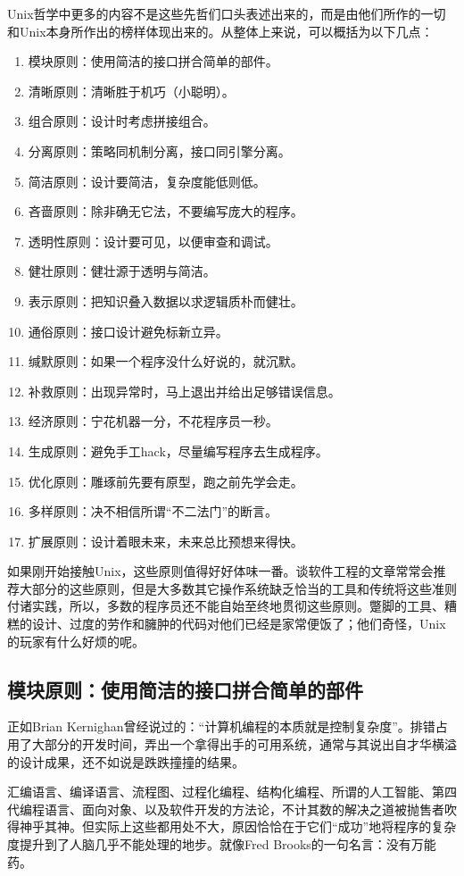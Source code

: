 \documentclass[12pt,oneside]{book}
\begin{document}
Unix哲学中更多的内容不是这些先哲们口头表述出来的，而是由他们所作的一切和Unix本身所作出的榜样体现出来的。从整体上来说，可以概括为以下几点：
\begin{enumerate}
\item 模块原则：使用简洁的接口拼合简单的部件。
\item 清晰原则：清晰胜于机巧（小聪明）。
\item 组合原则：设计时考虑拼接组合。
\item 分离原则：策略同机制分离，接口同引擎分离。
\item 简洁原则：设计要简洁，复杂度能低则低。
\item 吝啬原则：除非确无它法，不要编写庞大的程序。
\item 透明性原则：设计要可见，以便审查和调试。
\item 健壮原则：健壮源于透明与简洁。
\item 表示原则：把知识叠入数据以求逻辑质朴而健壮。
\item 通俗原则：接口设计避免标新立异。
\item 缄默原则：如果一个程序没什么好说的，就沉默。
\item 补救原则：出现异常时，马上退出并给出足够错误信息。
\item 经济原则：宁花机器一分，不花程序员一秒。
\item 生成原则：避免手工hack，尽量编写程序去生成程序。
\item 优化原则：雕琢前先要有原型，跑之前先学会走。
\item 多样原则：决不相信所谓“不二法门”的断言。
\item 扩展原则：设计着眼未来，未来总比预想来得快。
\end{enumerate}

如果刚开始接触Unix，这些原则值得好好体味一番。谈软件工程的文章常常会推荐大部分的这些原则，但是大多数其它操作系统缺乏恰当的工具和传统将这些准则付诸实践，所以，多数的程序员还不能自始至终地贯彻这些原则。蹩脚的工具、糟糕的设计、过度的劳作和臃肿的代码对他们已经是家常便饭了；他们奇怪，Unix的玩家有什么好烦的呢。


\subsection{模块原则：使用简洁的接口拼合简单的部件}
正如Brian Kernighan曾经说过的：“计算机编程的本质就是控制复杂度”\cite{Kernighan-Plauger}。排错占用了大部分的开发时间，弄出一个拿得出手的可用系统，通常与其说出自才华横溢的设计成果，还不如说是跌跌撞撞的结果。

汇编语言、编译语言、流程图、过程化编程、结构化编程、所谓的人工智能、第四代编程语言、面向对象、以及软件开发的方法论，不计其数的解决之道被抛售者吹得神乎其神。但实际上这些都用处不大，原因恰恰在于它们“成功”地将程序的复杂度提升到了人脑几乎不能处理的地步。就像Fred Brooks的一句名言\cite{Brooks}：没有万能药。
\end{document}
